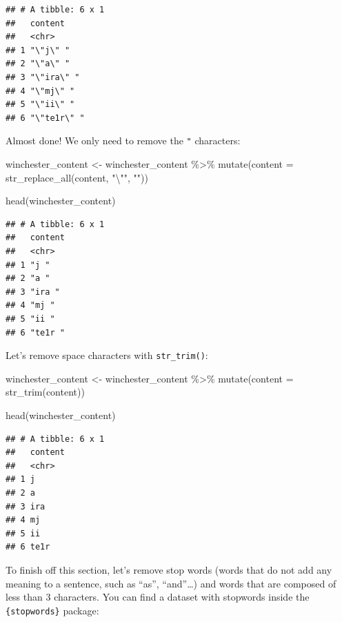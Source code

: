 \documentclass[
]{article}
\newenvironment{Shaded}{\begin{snugshade}}{\end{snugshade}}
\newcommand{\AttributeTok}[1]{\textcolor[rgb]{0.77,0.63,0.00}{#1}}
\newcommand{\FunctionTok}[1]{\textcolor[rgb]{0.00,0.00,0.00}{#1}}
\newcommand{\NormalTok}[1]{#1}
\newcommand{\OtherTok}[1]{\textcolor[rgb]{0.56,0.35,0.01}{#1}}
\newcommand{\SpecialCharTok}[1]{\textcolor[rgb]{0.00,0.00,0.00}{#1}}
\newcommand{\StringTok}[1]{\textcolor[rgb]{0.31,0.60,0.02}{#1}}
\begin{document}
\begin{verbatim}
## # A tibble: 6 x 1
##   content    
##   <chr>      
## 1 "\"j\" "   
## 2 "\"a\" "   
## 3 "\"ira\" " 
## 4 "\"mj\" "  
## 5 "\"ii\" "  
## 6 "\"te1r\" "
\end{verbatim}

Almost done! We only need to remove the \texttt{"} characters:

\begin{Shaded}
\begin{Highlighting}[]
\NormalTok{winchester\_content }\OtherTok{\textless{}{-}}\NormalTok{ winchester\_content }\SpecialCharTok{\%\textgreater{}\%} 
  \FunctionTok{mutate}\NormalTok{(}\AttributeTok{content =} \FunctionTok{str\_replace\_all}\NormalTok{(content, }\StringTok{"}\SpecialCharTok{\textbackslash{}"}\StringTok{"}\NormalTok{, }\StringTok{""}\NormalTok{)) }

\FunctionTok{head}\NormalTok{(winchester\_content)}
\end{Highlighting}
\end{Shaded}

\begin{verbatim}
## # A tibble: 6 x 1
##   content
##   <chr>  
## 1 "j "   
## 2 "a "   
## 3 "ira " 
## 4 "mj "  
## 5 "ii "  
## 6 "te1r "
\end{verbatim}

Let's remove space characters with \texttt{str\_trim()}:

\begin{Shaded}
\begin{Highlighting}[]
\NormalTok{winchester\_content }\OtherTok{\textless{}{-}}\NormalTok{ winchester\_content }\SpecialCharTok{\%\textgreater{}\%} 
  \FunctionTok{mutate}\NormalTok{(}\AttributeTok{content =} \FunctionTok{str\_trim}\NormalTok{(content)) }

\FunctionTok{head}\NormalTok{(winchester\_content)}
\end{Highlighting}
\end{Shaded}

\begin{verbatim}
## # A tibble: 6 x 1
##   content
##   <chr>  
## 1 j      
## 2 a      
## 3 ira    
## 4 mj     
## 5 ii     
## 6 te1r
\end{verbatim}

To finish off this section, let's remove stop words (words that do not add any meaning to a sentence,
such as ``as'', ``and''\ldots) and words that are composed of less than 3 characters. You can find a dataset
with stopwords inside the \texttt{\{stopwords\}} package:
\end{document}
